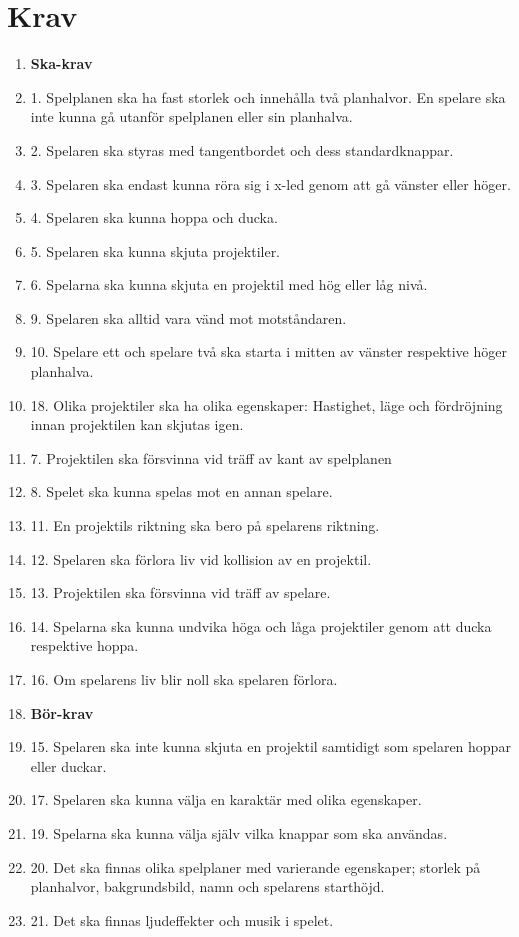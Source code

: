 \documentclass{TDP003mall}
\begin{document}
\section{Krav}
\begin{enumerate}
\item[] \textbf{Ska-krav}

\item[] 1. Spelplanen ska ha fast storlek och innehålla två planhalvor. En spelare ska inte kunna gå utanför spelplanen eller sin planhalva.
\item[] 2. Spelaren ska styras med tangentbordet och dess standardknappar.
\item[] 3. Spelaren ska endast kunna röra sig i x-led genom att gå vänster eller höger.
\item[] 4. Spelaren ska kunna hoppa och ducka.
\item[] 5. Spelaren ska kunna skjuta projektiler.
\item[] 6. Spelarna ska kunna skjuta en projektil med hög eller låg nivå.
\item[] 9. Spelaren ska alltid vara vänd mot motståndaren.
\item[] 10. Spelare ett och spelare två ska starta i mitten av vänster respektive höger planhalva.
\item[] 18. Olika projektiler ska ha olika egenskaper: Hastighet, läge och fördröjning innan projektilen kan skjutas igen.
\item[] 7. Projektilen ska försvinna vid träff av kant av spelplanen
\item[] 8. Spelet ska kunna spelas mot en annan spelare.
\item[] 11. En projektils riktning ska bero på spelarens riktning.
\item[] 12. Spelaren ska förlora liv vid kollision av en projektil.
\item[] 13. Projektilen ska försvinna vid träff av spelare.
\item[] 14. Spelarna ska kunna undvika höga och låga projektiler genom att ducka respektive hoppa.
\item[] 16. Om spelarens liv blir noll ska spelaren förlora.
\item[] \textbf{Bör-krav}
\item[] 15. Spelaren ska inte kunna skjuta en projektil samtidigt som spelaren hoppar eller duckar.
\item[] 17. Spelaren ska kunna välja en karaktär med olika egenskaper.
\item[] 19. Spelarna ska kunna välja själv vilka knappar som ska användas.
\item[] 20. Det ska finnas olika spelplaner med varierande egenskaper; storlek på planhalvor, bakgrundsbild, namn och spelarens starthöjd.
\item[] 21. Det ska finnas ljudeffekter och musik i spelet.

\end{enumerate}
\end{document}
